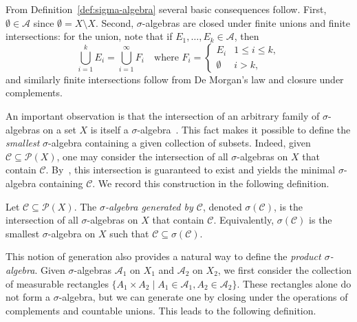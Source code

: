 \medskip

From Definition~\ref{def:sigma-algebra} several basic consequences follow. First, $\emptyset \in \mathcal{A}$ since $\emptyset = X \setminus X$. Second, $\sigma$-algebras are closed under finite unions and finite intersections: for the union, note that if $E_1, \dots, E_k \in \mathcal{A}$, then
\[
    \bigcup_{i=1}^k E_i = \bigcup_{i=1}^\infty F_i \quad \text{where }
    F_i =
    \begin{cases}
        E_i & 1 \leq i \leq k,\\
        \emptyset & i > k,
    \end{cases}
\]
and similarly finite intersections follow from De Morgan’s law and closure under complements.

\medskip
An important observation is that the intersection of an arbitrary family of $\sigma$-algebras on a set $X$ is itself a $\sigma$-algebra~\cite[Prop.~1.1.2]{MeasureTheoryCohn}. This fact makes it possible to define the \emph{smallest} $\sigma$-algebra containing a given collection of subsets. Indeed, given $\mathcal{C} \subseteq \mathcal{P}(X)$, one may consider the intersection of all $\sigma$-algebras on $X$ that contain $\mathcal{C}$. By~\cite[Cor.~1.1.3]{MeasureTheoryCohn}, this intersection is guaranteed to exist and yields the minimal $\sigma$-algebra containing $\mathcal{C}$. We record this construction in the following definition.

\begin{definition}
    \label{def:sigma-generated}
    Let $\mathcal{C} \subseteq \mathcal{P}(X)$. The \emph{$\sigma$-algebra generated by $\mathcal{C}$}, denoted $\sigma(\mathcal{C})$, is the intersection of all $\sigma$-algebras on $X$ that contain $\mathcal{C}$. Equivalently, $\sigma(\mathcal{C})$ is the smallest $\sigma$-algebra on $X$ such that $\mathcal{C} \subseteq \sigma(\mathcal{C})$.
\end{definition}

This notion of generation also provides a natural way to define the \emph{product $\sigma$-algebra}. Given $\sigma$-algebras $\mathcal{A}_1$ on $X_1$ and $\mathcal{A}_2$ on $X_2$, we first consider the collection of measurable rectangles $\{A_1 \times A_2 \mid A_1 \in \mathcal{A}_1, A_2 \in \mathcal{A}_2\}$. These rectangles alone do not form a $\sigma$-algebra, but we can generate one by closing under the operations of complements and countable unions. This leads to the following definition.

